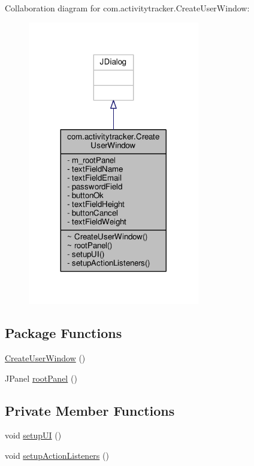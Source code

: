 Collaboration diagram for com.\+activitytracker.\+Create\+User\+Window\+:
\nopagebreak
\begin{figure}[H]
\begin{center}
\leavevmode
\includegraphics[width=212pt]{classcom_1_1activitytracker_1_1_create_user_window__coll__graph}
\end{center}
\end{figure}
\subsection*{Package Functions}
\begin{DoxyCompactItemize}
\item 
\hyperlink{classcom_1_1activitytracker_1_1_create_user_window_a46b8b719c490fe8f658fa7a1f27d0be7}{Create\+User\+Window} ()
\item 
J\+Panel \hyperlink{classcom_1_1activitytracker_1_1_create_user_window_a862f018ae96eb5df7529ff1beb312ff1}{root\+Panel} ()
\end{DoxyCompactItemize}
\subsection*{Private Member Functions}
\begin{DoxyCompactItemize}
\item 
void \hyperlink{classcom_1_1activitytracker_1_1_create_user_window_a41715d85194c6bb84cf6969f771940dc}{setup\+UI} ()
\item 
void \hyperlink{classcom_1_1activitytracker_1_1_create_user_window_a174a05a389ca6f3b7979ac9c5028a3ae}{setup\+Action\+Listeners} ()
\end{DoxyCompactItemize}
